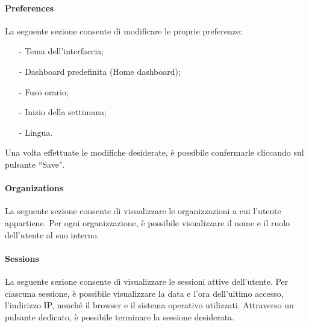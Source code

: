 \documentclass[10pt]{article}
\begin{document}
\begin{justify}
    \paragraph{Preferences}
    La seguente sezione consente di modificare le proprie preferenze:  
    \begin{itemize}  
        \item[-] Tema dell'interfaccia;  
        \item[-] Dashboard predefinita (Home dashboard);  
        \item[-] Fuso orario;  
        \item[-] Inizio della settimana;  
        \item[-] Lingua.  
    \end{itemize}  
    Una volta effettuate le modifiche desiderate, è possibile confermarle cliccando sul pulsante ``Save". 
    
    \paragraph{Organizations}
    La seguente sezione consente di visualizzare le organizzazioni a cui l'utente appartiene. Per ogni organizzazione, è possibile visualizzare il nome e il ruolo dell'utente al suo interno.  
    
    \paragraph{Sessions}
    La seguente sezione consente di visualizzare le sessioni attive dell'utente. Per ciascuna sessione, è possibile visualizzare la data e l'ora dell'ultimo accesso, l'indirizzo IP, nonché il browser e il sistema operativo utilizzati. Attraverso un pulsante dedicato, è possibile terminare la sessione desiderata.


\end{justify}
\end{document}
